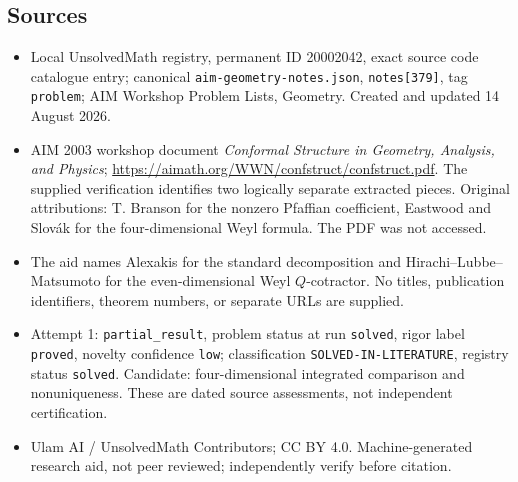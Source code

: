 \documentclass[11pt]{article}
\begin{document}
\subsection{Sources}
\begin{itemize}
\item Local UnsolvedMath registry, permanent ID 20002042, exact source code catalogue entry; canonical \texttt{aim-geometry-notes.json}, \texttt{notes[379]}, tag \texttt{problem}; AIM Workshop Problem Lists, Geometry. Created and updated 14 August 2026.
\item AIM 2003 workshop document \emph{Conformal Structure in Geometry, Analysis, and Physics}; \url{https://aimath.org/WWN/confstruct/confstruct.pdf}. The supplied verification identifies two logically separate extracted pieces. Original attributions: T. Branson for the nonzero Pfaffian coefficient, Eastwood and Slovák for the four-dimensional Weyl formula. The PDF was not accessed.
\item The aid names Alexakis for the standard decomposition and Hirachi--Lubbe--Matsumoto for the even-dimensional Weyl \(Q\)-cotractor. No titles, publication identifiers, theorem numbers, or separate URLs are supplied.
\item Attempt 1: \texttt{partial\_result}, problem status at run \texttt{solved}, rigor label \texttt{proved}, novelty confidence \texttt{low}; classification \texttt{SOLVED-IN-LITERATURE}, registry status \texttt{solved}. Candidate: four-dimensional integrated comparison and nonuniqueness. These are dated source assessments, not independent certification.
\item Ulam AI / UnsolvedMath Contributors; CC BY 4.0. Machine-generated research aid, not peer reviewed; independently verify before citation.
\end{itemize}
\end{document}
